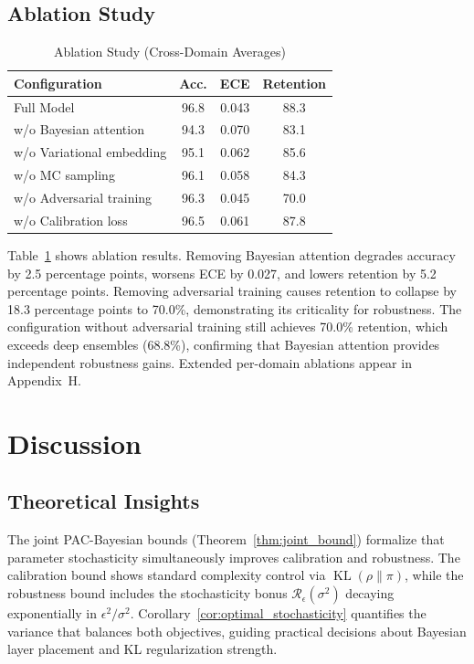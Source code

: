 \documentclass[12pt,a4paper]{article}
\theoremstyle{definition}
\DeclareMathOperator{\KL}{KL}
\begin{document}
\subsection{Ablation Study}

\begin{table}[t]
\caption{Ablation Study (Cross-Domain Averages)}
\label{tab:ablation}
\centering
\small
\begin{tabular}{@{}lccc@{}}
\toprule
Configuration & Acc. & ECE & Retention\\
\midrule
Full Model & 96.8 & 0.043 & 88.3 \\
w/o Bayesian attention & 94.3 & 0.070 & 83.1 \\
w/o Variational embedding & 95.1 & 0.062 & 85.6 \\
w/o MC sampling & 96.1 & 0.058 & 84.3 \\
w/o Adversarial training & 96.3 & 0.045 & 70.0 \\
w/o Calibration loss & 96.5 & 0.061 & 87.8 \\
\bottomrule
\end{tabular}
\end{table}

Table~\ref{tab:ablation} shows ablation results. Removing Bayesian attention degrades accuracy by 2.5 percentage points, worsens ECE by 0.027, and lowers retention by 5.2 percentage points. Removing adversarial training causes retention to collapse by 18.3 percentage points to 70.0\%, demonstrating its criticality for robustness. The configuration without adversarial training still achieves 70.0\% retention, which exceeds deep ensembles (68.8\%), confirming that Bayesian attention provides independent robustness gains. Extended per-domain ablations appear in Appendix~H.

\section{Discussion}

\subsection{Theoretical Insights}

The joint PAC-Bayesian bounds (Theorem~\ref{thm:joint_bound}) formalize that parameter stochasticity simultaneously improves calibration and robustness. The calibration bound shows standard complexity control via $\KL(\rho\|\pi)$, while the robustness bound includes the stochasticity bonus $\mathcal{R}_\epsilon(\sigma^2)$ decaying exponentially in $\epsilon^2/\sigma^2$. Corollary~\ref{cor:optimal_stochasticity} quantifies the variance that balances both objectives, guiding practical decisions about Bayesian layer placement and KL regularization strength.
\end{document}
